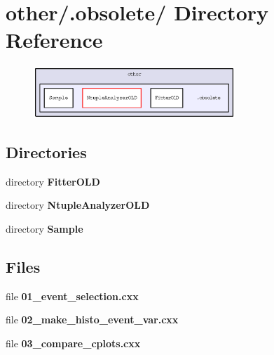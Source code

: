 \section{other/.obsolete/ Directory Reference}
\label{dir_1d717b04dc2618a0527eb1f7971a3248}


\begin{figure}[H]
\begin{center}
\leavevmode
\includegraphics[width=215pt]{dir_1d717b04dc2618a0527eb1f7971a3248_dep}
\end{center}
\end{figure}
\subsection*{Directories}
\begin{CompactItemize}
\item 
directory \bf{Fitter\-OLD}
\item 
directory \bf{Ntuple\-Analyzer\-OLD}
\item 
directory \bf{Sample}
\end{CompactItemize}
\subsection*{Files}
\begin{CompactItemize}
\item 
file \textbf{01\_\-event\_\-selection.cxx}
\item 
file \textbf{02\_\-make\_\-histo\_\-event\_\-var.cxx}
\item 
file \textbf{03\_\-compare\_\-cplots.cxx}
\end{CompactItemize}
